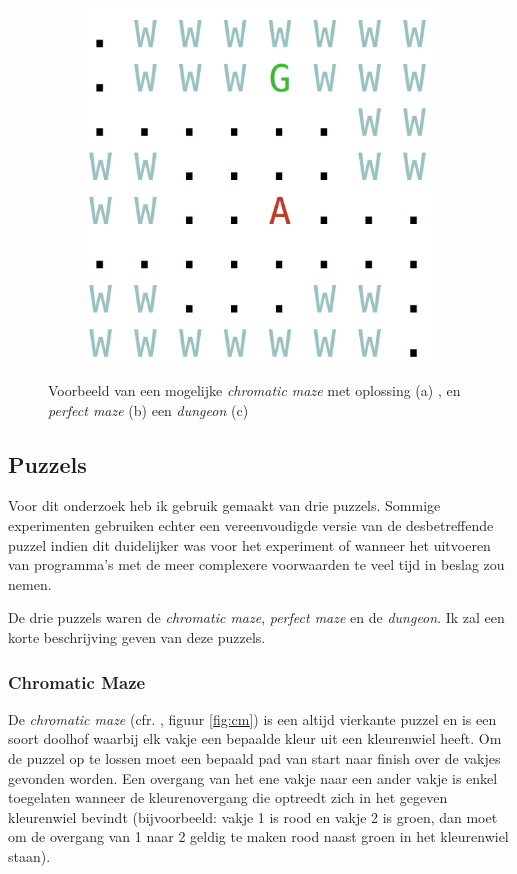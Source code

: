 \documentclass{article}
\begin{document}
\begin{figure}[t]
\hspace{.083\textwidth}
\begin{subfigure}{.25\textwidth}
  \centering
  \includegraphics[width=\linewidth]{Images/dungeon.png}
  \caption{}
  \label{fig:dung}
\end{subfigure}
\caption{Voorbeeld van een mogelijke \textit{chromatic maze} met oplossing (a) , en \textit{perfect maze} (b) een \textit{dungeon} (c)}
\label{fig:test}
\end{figure}	

	\subsection{Puzzels}
	Voor dit onderzoek heb ik gebruik gemaakt van drie puzzels. Sommige experimenten gebruiken echter een vereenvoudigde versie van de desbetreffende puzzel indien dit duidelijker was voor het experiment of wanneer het uitvoeren van programma's met de meer complexere voorwaarden te veel tijd in beslag zou nemen.
	
	De drie puzzels waren de \textit{chromatic maze}, \textit{perfect maze} en de \textit{dungeon}. Ik zal een korte beschrijving geven van deze puzzels.
	\subsubsection*{Chromatic Maze}
	De \textit{chromatic maze} (cfr. \cite{journals/tciaig/SmithM11}, figuur \ref{fig:cm}) is een altijd vierkante puzzel en is een soort doolhof waarbij  elk vakje een bepaalde kleur uit een kleurenwiel heeft. Om de puzzel op te lossen moet een bepaald pad van start naar finish over de vakjes gevonden worden. Een overgang van het ene vakje naar een ander vakje is enkel toegelaten wanneer de kleurenovergang die optreedt zich in het gegeven kleurenwiel bevindt (bijvoorbeeld: vakje 1 is rood en vakje 2 is groen, dan moet om de overgang van 1 naar 2 geldig te maken rood naast groen in het kleurenwiel staan).
	
\end{document}
